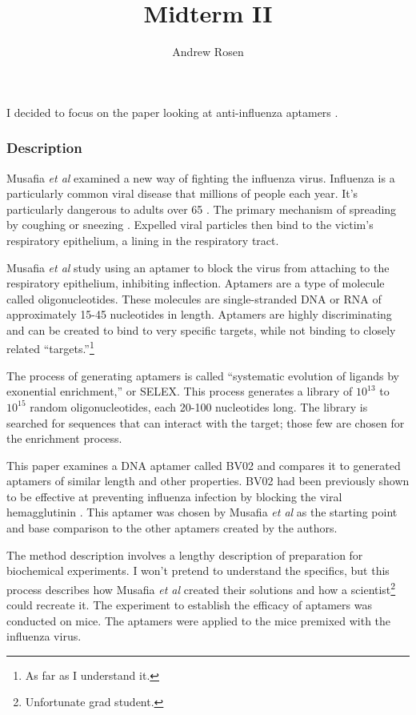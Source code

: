 \documentclass[10pt,a4paper]{article}
\author{Andrew Rosen}
\title{Midterm II}
\begin{document}
	\maketitle
	
	I decided to focus on the paper looking at anti-influenza aptamers  \cite{musafia2014designing}.
	
	
	\subsubsection*{Description}
	
	Musafia \textit{et al} examined a new way of fighting the influenza virus.
	Influenza is a particularly common viral disease that millions of people each year.
	It's particularly dangerous to adults over 65 \cite{centers2010estimates}.
	The primary mechanism of spreading  by coughing or sneezing \cite{stephenson2002epidemiology}.
	Expelled viral particles then bind to the victim's respiratory epithelium, a lining in the respiratory tract.
	
	Musafia \textit{et al} study using an aptamer to block the virus from attaching to the respiratory epithelium, inhibiting inflection.
	Aptamers are a type of molecule called oligonucleotides.
	These molecules are single-stranded DNA or RNA of approximately 15-45 nucleotides in length. 
	Aptamers  are highly discriminating and can be created to bind to very specific targets, while not binding to closely related ``targets.''\footnote{As far as I understand it.}
	
	The process of generating aptamers is called ``systematic evolution of ligands by exonential enrichment,'' or SELEX.
	This process generates a library of $ 10^{13} $ to $ 10 ^{15} $ random oligonucleotides, each 20-100 nucleotides long.
	The library is searched for sequences that can interact with the target; those few are chosen for the enrichment process.
	
	This paper examines a DNA aptamer called BV02 and compares it to generated aptamers of similar length and other properties.
	BV02 had been previously shown to be effective at preventing influenza infection by blocking the viral hemagglutinin \cite{jeon2004dna}.
	This aptamer was chosen by Musafia \textit{et al} as the starting point and base comparison to the other aptamers created by the authors.
		
	The method description involves a lengthy description of preparation  for biochemical experiments.  
	I won't pretend to understand the specifics, but this process describes how Musafia \textit{et al}  created their solutions and how a scientist\footnote{Unfortunate grad student.} could recreate it.
	The experiment to establish the efficacy of aptamers was conducted on mice.
	The aptamers were applied to the mice premixed with the influenza virus.
	
\end{document}
